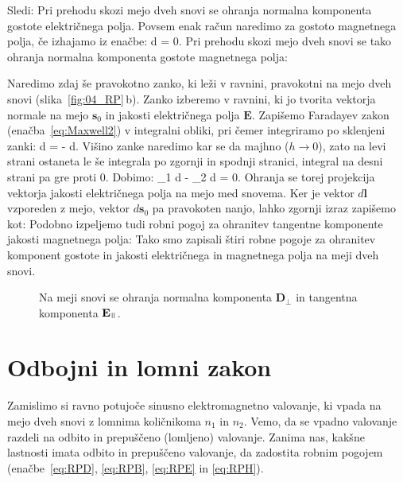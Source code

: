 Sledi:
Pri prehodu skozi mejo dveh snovi se ohranja normalna komponenta gostote
električnega polja. Povsem enak račun naredimo za gostoto magnetnega polja, 
če izhajamo iz enačbe:
\beq
\oint {}\cdot d = 0.
\label{eq:04_03}
\eeq
Pri prehodu skozi mejo dveh snovi se tako ohranja normalna komponenta
gostote magnetnega polja:

Naredimo zdaj še pravokotno zanko, ki leži v ravnini, pravokotni na mejo dveh 
snovi (slika~\ref{fig:04_RP}\,b). Zanko izberemo v ravnini, ki jo tvorita vektorja normale na 
mejo $\mathbf{s}_0$ in jakosti električnega polja $\mathbf{E}$. 
Zapišemo Faradayev zakon (enačba~\ref{eq:Maxwell2}) v integralni obliki, pri 
čemer integriramo po sklenjeni zanki:
\beq
\oint {}\cdot d = - \int {}\cdot d.
\label{eq:04_04}
\eeq
Višino zanke naredimo kar se da majhno ($h \to 0$), zato na levi strani ostaneta le še 
integrala po zgornji in spodnji stranici, integral na desni strani pa gre proti 0. Dobimo:
\beq
{}_1 \cdot d - _2 \cdot d = 0.
\label{eq:04_05}
\eeq
Ohranja se torej projekcija vektorja jakosti električnega polja na mejo med snovema. 
Ker je vektor $d\mathbf{l}$ vzporeden z mejo, vektor $d\mathbf{s}_0$ pa 
pravokoten nanjo, lahko zgornji izraz zapišemo kot:
Podobno izpeljemo tudi robni pogoj za ohranitev tangentne komponente
jakosti magnetnega polja:
Tako smo zapisali štiri robne pogoje za ohranitev komponent gostote in jakosti električnega
in magnetnega polja na meji dveh snovi. 
\begin{figure}[!h]
\centering
\def\svgwidth{80truemm} 

\caption{Na meji snovi se ohranja normalna komponenta $\mathbf{D}_\perp$ in tangentna komponenta 
$\mathbf{E}_\myparallel$.}
\label{fig:04_RP2}
\end{figure}

\section{Odbojni in lomni zakon}
Zamislimo si ravno potujoče sinusno elektromagnetno valovanje, 
ki vpada na mejo dveh snovi z lomnima količnikoma $n_1$ in $n_2$. 
Vemo, da se vpadno valovanje razdeli na odbito in prepuščeno (lomljeno) 
valovanje. Zanima nas, kakšne lastnosti imata odbito in prepuščeno 
valovanje, da zadostita robnim pogojem (enačbe~\ref{eq:RPD}, \ref{eq:RPB}, 
\ref{eq:RPE} in \ref{eq:RPH}). 

